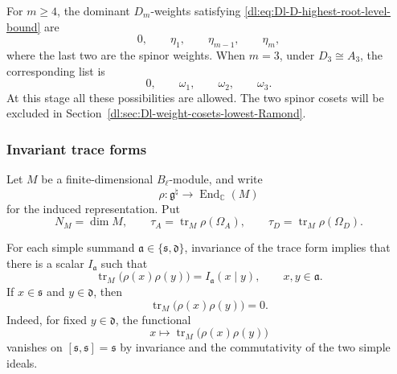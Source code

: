 \documentclass[11pt,reqno]{amsart}
\theoremstyle{definition}
\theoremstyle{remark}
\begin{document}
For \(m\ge4\), the dominant \(D_m\)-weights satisfying
\eqref{dl:eq:Dl-D-highest-root-level-bound} are
\begin{equation}
  0,
  \qquad
  \eta_1,
  \qquad
  \eta_{m-1},
  \qquad
  \eta_m,
  \label{dl:eq:Dl-D-level-one-dominant-weights}
\end{equation}
where the last two are the spinor weights.  When \(m=3\), under
\(D_3\cong A_3\), the corresponding list is
\begin{equation}
  0,
  \qquad
  \omega_1,
  \qquad
  \omega_2,
  \qquad
  \omega_3.
  \label{dl:eq:Dl-D3-level-one-dominant-weights}
\end{equation}
At this stage all these possibilities are allowed.  The two spinor
cosets will be excluded in Section~\ref{dl:sec:Dl-weight-cosets-lowest-Ramond}.

\subsubsection{Invariant trace forms}


Let \(M\) be a finite-dimensional \(B_\ell\)-module, and write
\begin{equation*}
  \rho:
  \mathfrak g^\natural
  \longrightarrow
  \operatorname{End}_{\mathbb C}(M)
\end{equation*}
for the induced representation.  Put
\begin{equation*}
  N_M=\dim M,
  \qquad
  \tau_A=\operatorname{tr}_M\rho(\Omega_A),
  \qquad
  \tau_D=\operatorname{tr}_M\rho(\Omega_D).
\end{equation*}

For each simple summand
\(\mathfrak a\in\{\mathfrak s,\mathfrak d\}\), invariance of the trace
form implies that there is a scalar \(I_{\mathfrak a}\) such that
\begin{equation}
  \operatorname{tr}_M
  \bigl(
    \rho(x)\rho(y)
  \bigr)
  =
  I_{\mathfrak a}(x\mid y),
  \qquad
  x,y\in\mathfrak a.
  \label{dl:eq:Dl-Dynkin-index-trace-form}
\end{equation}
If \(x\in\mathfrak s\) and \(y\in\mathfrak d\), then
\begin{equation}
  \operatorname{tr}_M
  \bigl(
    \rho(x)\rho(y)
  \bigr)=0.
  \label{dl:eq:Dl-mixed-trace-form-zero}
\end{equation}
Indeed, for fixed \(y\in\mathfrak d\), the functional
\[
  x\longmapsto
  \operatorname{tr}_M\bigl(\rho(x)\rho(y)\bigr)
\]
vanishes on
\([\mathfrak s,\mathfrak s]=\mathfrak s\) by invariance and the
commutativity of the two simple ideals.
\end{document}
